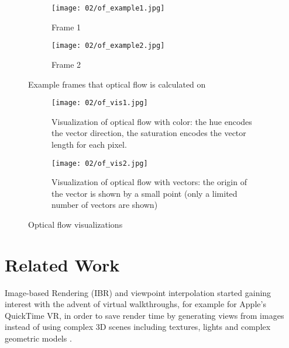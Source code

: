 \begin{figure}
\centering
    \begin{subfigure}[t]{0.5\textwidth}            
            \centering
            \texttt{[image: 02/of\_example1.jpg]}
            \caption{Frame 1}
    \end{subfigure}%
    \begin{subfigure}[t]{0.5\textwidth}
            \centering
            \texttt{[image: 02/of\_example2.jpg]}
            \caption{Frame 2}
    \end{subfigure}
    \caption[Optical flow example]{Example frames that optical flow is calculated on}\label{fig:of_example_bike}

    \quad
    \begin{subfigure}[t]{0.5\textwidth}            
            \centering
            \texttt{[image: 02/of\_vis1.jpg]}
            \caption{Visualization of optical flow with color: the hue encodes the vector direction, the saturation encodes the vector length for each pixel.}
    \end{subfigure}%
    \begin{subfigure}[t]{0.5\textwidth}
            \centering
            \texttt{[image: 02/of\_vis2.jpg]}
            \caption{Visualization of optical flow with vectors: the origin of the vector is shown by a small point (only a limited number of vectors are shown)}
    \end{subfigure}
    \caption[Optical flow visualizations]{Optical flow visualizations}\label{fig:of_vis}
\end{figure}

\section{Related Work}
Image-based Rendering (IBR) and viewpoint interpolation started gaining interest with the advent of virtual walkthroughs, for example for Apple's QuickTime\textsuperscript{\textregistered} VR, in order to save render time by generating views from images instead of using complex 3D scenes including textures, lights and complex geometric models \cite{quicktime}.

